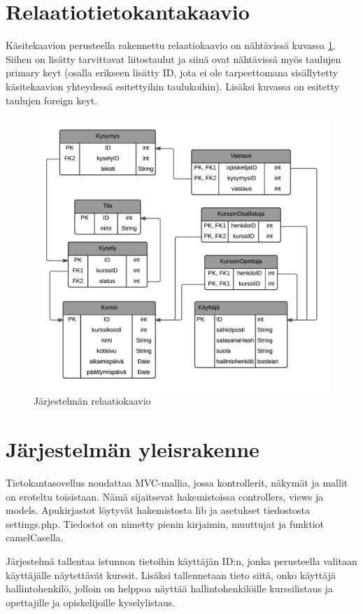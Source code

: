\documentclass[12pt,a4paper,titlepage]{article}
\begin{document}
\section{Relaatiotietokantakaavio}
Käsitekaavion perusteella rakennettu relaatiokaavio on nähtävissä kuvassa \ref{fig:relaatiokaavio}. Siihen on lisätty tarvittavat liitostaulut ja siinä ovat nähtävissä myös taulujen primary keyt (osalla erikseen lisätty ID, jota ei ole tarpeettomana sisällytetty käsitekaavion yhteydessä esitettyihin taulukoihin). Lisäksi kuvassa on esitetty taulujen foreign keyt.

\begin{figure}
   \centering
   \includegraphics[width=\textwidth]{kuvat/relaatiokaavio-pysty.png}
   \caption{Järjestelmän relaatiokaavio}\label{fig:relaatiokaavio}
\end{figure}

\section{Järjestelmän yleisrakenne}
Tietokantasovellus noudattaa MVC-mallia, jossa kontrollerit, näkymät ja mallit on eroteltu toisistaan. Nämä sijaitsevat hakemistoissa controllers, views ja models. Apukirjastot löytyvät hakemistosta lib ja asetukset tiedostosta settings.php. Tiedostot on nimetty pienin kirjaimin, muuttujat ja funktiot camelCasella.

Järjestelmä tallentaa istunnon tietoihin käyttäjän ID:n, jonka perusteella valitaan käyttäjälle näytettävät kurssit. Lisäksi tallennetaan tieto siitä, onko käyttäjä hallintohenkilö, jolloin on helppoa näyttää hallintohenkilöille kurssilistaus ja opettajille ja opiskelijoille kyselylistaus.
\end{document}
